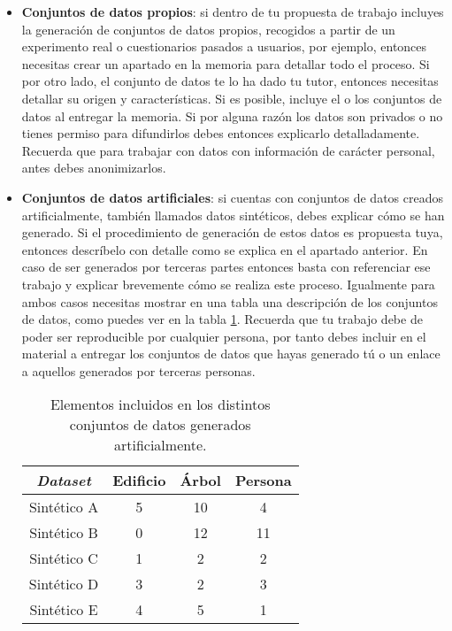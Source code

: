 \begin{itemize}
    \item {\bf Conjuntos de datos propios}: si dentro de tu propuesta de trabajo incluyes la generación de conjuntos de datos propios, recogidos a partir de un experimento real o cuestionarios pasados a usuarios, por ejemplo, entonces necesitas crear un apartado en la memoria para detallar todo el proceso. Si por otro lado, el conjunto de datos te lo ha dado tu tutor, entonces necesitas detallar su origen y características. Si es posible, incluye el o los conjuntos de datos al entregar la memoria. Si por alguna razón los datos son privados o no tienes permiso para difundirlos debes entonces explicarlo detalladamente. Recuerda que para trabajar con datos con información de carácter personal, antes debes anonimizarlos. 
    \item {\bf Conjuntos de datos artificiales}: si cuentas con conjuntos de datos creados artificialmente, también llamados datos sintéticos, debes explicar cómo se han generado. Si el procedimiento de generación de estos datos es propuesta tuya, entonces descríbelo con detalle como se explica en el apartado anterior. En caso de ser generados por terceras partes entonces basta con referenciar ese trabajo y explicar brevemente cómo se realiza este proceso. Igualmente para ambos casos necesitas mostrar en una tabla una descripción de los conjuntos de datos, como puedes ver en la tabla \ref{tab:fake}. Recuerda que tu trabajo debe de poder ser reproducible por cualquier persona, por tanto debes incluir en el material a entregar los conjuntos de datos que hayas generado tú o un enlace a aquellos generados por terceras personas.

\begin{table}[!ht]
\centering
\caption{Elementos incluidos en los distintos conjuntos de datos generados artificialmente.}
\label{tab:results}
\begin{tabular}{c|ccc}
\hline
{\it \textbf{Dataset}} & \textbf{Edificio} & \textbf{Árbol} & \textbf{Persona} \\
\hline
Sintético A & 5 & 10 & 4 \\
Sintético B & 0 & 12 & 11 \\
Sintético C & 1 & 2 & 2 \\
Sintético D & 3 & 2 & 3 \\
Sintético E & 4 & 5 & 1 \\
\hline
\end{tabular}
\label{tab:fake}
\end{table}
\end{itemize}


